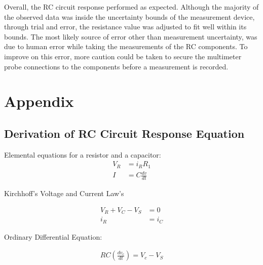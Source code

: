 \documentclass[10pt,twocolumn]{article}
\begin{document}
Overall, the RC circuit response performed as expected. Although the majority of the observed data was inside the uncertainty bounds of the measurement device, through trial and error, the resistance value was adjusted to fit well within its bounds. The most likely source of error other than measurement uncertainty, was due to human error while taking the measurements of the RC components. To improve on this error, more caution could be taken to secure the multimeter probe connections to the components before a measurement is recorded. 




\appendix

\section{Appendix}

\subsection{Derivation of RC Circuit Response Equation}

Elemental equations for a resistor and a capacitor: 
\begin{equation} \label{eq1}
\begin{split}
V_{R}&=i_{R}R_{1} \\
I&=C\frac{dv}{dt}
\end{split}
\end{equation} 

Kirchhoff's Voltage and Current Law's

\begin{equation} \label{eq2}
\begin{split}
V_{R} + V_{C} - V_{S}&=0 \\
i_{R}&=i_{C}
\end{split}
\end{equation} 


Ordinary Differential Equation:


\begin{equation} \label{eq3}
\begin{split}
RC(\frac{dv_c}{dt})=V_{c}-V_{S} \\
\end{split}
\end{equation}
\end{document}

